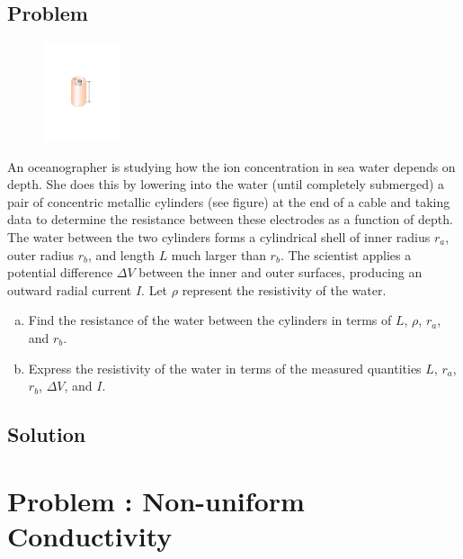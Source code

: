 \documentclass[solutions]{esg8022pset}
\renewcommand{\d}{\,d}
\begin{document}
\subsection{Problem}
  \begin{figure}
    \begin{center}\includegraphics[width=0.20\textwidth]{ps06_02_01.pdf}\end{center}
  \end{figure}
  An oceanographer is studying how the ion concentration in sea water depends on depth. She does this by lowering into the water (until completely submerged) a pair of concentric metallic cylinders (see figure) at the end of a cable and taking data to determine the resistance between these electrodes as a function of depth. The water between the two cylinders forms a cylindrical shell of inner radius $r_a$, outer radius $r_b$, and length $L$ much larger than $r_b$. The scientist applies a potential difference $\Delta V$ between the inner and outer surfaces, producing an outward radial current $I$. Let $\rho$ represent the resistivity of the water.
  \begin{enumerate}[(a)]
    \item Find the resistance of the water between the cylinders in terms of $L$, $\rho$, $r_a$, and $r_b$.
    \item Express the resistivity of the water in terms of the measured quantities $L$, $r_a$, $r_b$, $\Delta V$, and $I$.
  \end{enumerate}
\subsection{Solution}

\section{Problem \thesection: Non-uniform Conductivity}
\end{document}

